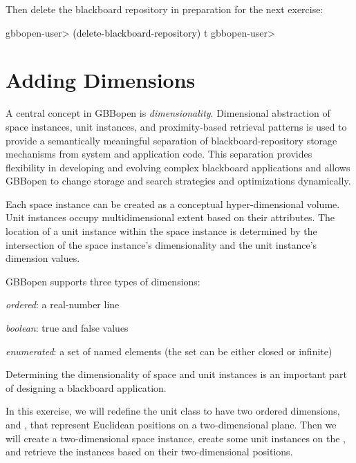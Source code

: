 \documentclass[10pt,twoside,english,pdftex]{article}
\begin{document}
%
Then delete the blackboard repository in preparation for the next exercise:
%
\W\supp
\begin{example}
\textcolor{darkergray}{%
  gbbopen-user> \textcolor{black}{(delete-blackboard-repository)}
  t
  gbbopen-user>}
\end{example}


\T\markright{}%
\T\pagestyle{plain}
\T\cleardoublepage
\W{}
\T\pagestyle{fancy}
\T\thispagestyle{fancybottom}
\T\renewcommand{\headrulewidth}{0pt}
\section{Adding Dimensions}
\label{sec:dimensions}%

A central concept in GBBopen is \textit{dimensionality}.  Dimensional
abstraction of space instances, unit instances, and proximity-based
retrieval patterns is used to provide a semantically meaningful
separation of blackboard-repository storage mechanisms from system and
application code.  This separation provides flexibility in developing
and evolving complex blackboard applications and allows GBBopen to
change storage and search strategies and optimizations dynamically.

Each space instance can be created as a conceptual hyper-dimensional
volume.  Unit instances occupy multidimensional extent based on their
attributes.  The location of a unit instance within the space instance
is determined by the intersection of the space instance's
dimensionality and the unit instance's dimension values.

GBBopen supports three types of dimensions:
\begin{tightitemize}
\item \textit{ordered}: a real-number line
\item \textit{boolean}: true and false values
\item \textit{enumerated}: a set of named elements (the set can be
  either closed or infinite)
\end{tightitemize}
Determining the dimensionality of space and unit instances is an
important part of designing a blackboard application.

In this exercise, we will redefine the  unit class to
have two ordered dimensions,  and , that represent
Euclidean positions on a two-dimensional plane.  Then we will create a
two-dimensional  space instance, create some
 unit instances on the , and retrieve
the instances based on their two-dimensional positions.
\end{document}
